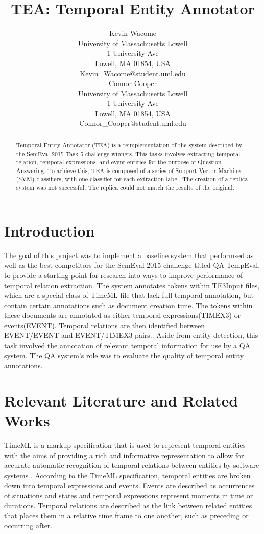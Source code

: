 \documentclass[11pt,letterpaper]{article}
\title{TEA: Temporal Entity Annotator}
\author{Kevin Wacome\\
	    University of Massachusetts Lowell\\
	    1 University Ave\\
	    Lowell, MA 01854, USA\\
	    Kevin\_Wacome@student.uml.edu\\
	  \And
		Connor Cooper\\
	  	University of Massachusetts Lowell\\
	  	1 University Ave\\
	  	Lowell, MA 01854, USA\\
		Connor\_Cooper@student.uml.edu\\}
\begin{document}
\maketitle
\begin{abstract}
Temporal Entity Annotator (TEA) is a reimplementation of the system described by the SemEval-2015 Task-5 challenge winners. This tasks involves extracting temporal relation, temporal expressions, and event entities for the purpose of Question Answering. To achieve this, TEA is composed of a series of Support Vector Machine (SVM) classifiers, with one classifier for each extraction label. The creation of a replica system was not successful. The replica could not match the results of the original.
\end{abstract}

\section{Introduction}

The goal of this project was to implement a baseline system that performsed as well as the best competitors for the SemEval 2015 challenge titled QA TempEval, to provide a starting point for research into ways to improve performance of temporal relation extraction. The system annotates tokens within TE3Input files, which are a special class of TimeML file that lack full temporal annotation, but contain certain annotations such as document creation time. The tokens within these documents are annotated as either temporal expressions(TIMEX3) or events(EVENT). Temporal relations are then identified between EVENT/EVENT and EVENT/TIMEX3 pairs.\cite{Llorens:15}. Aside from entity detection, this task involved the annotation of relevant temporal information for use by a QA system. The QA system's role was to evaluate the quality of temporal entity annotations.


\section{Relevant Literature and Related Works}

TimeML is a markup specification that is used to represent temporal entities with the aims of providing a rich and informative representation to allow for accurate automatic recognition of temporal relations between entities by software systems \cite{Pustejovsky:03}. According to the TimeML specification, temporal entities are broken down into temporal expressions and events. Events are described as occurrences of situations and states and temporal expressions represent moments in time or durations. Temporal relations are described as the link between related entities that places them in a relative time frame to one another, such as preceding or occurring after.
\end{document}
